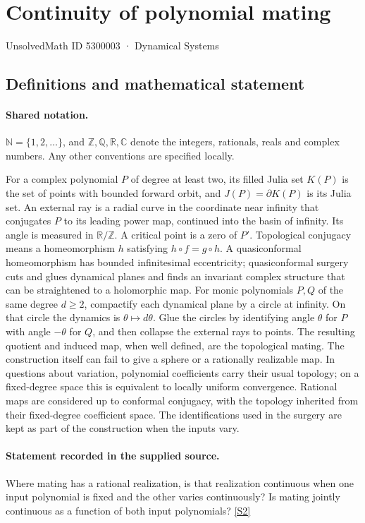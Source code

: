 \documentclass[11pt]{article}
\newcommand{\sref}[2]{\hyperlink{source:#1:#2}{[S#2]}}
\begin{document}
\setcounter{section}{5300002}
\section{Continuity of polynomial mating}\label{5300003}
{\small\sffamily UnsolvedMath ID 5300003 · Dynamical Systems}
\subsection{Definitions and mathematical statement}

\paragraph{Shared notation.}$\mathbb N=\{1,2,\ldots\}$, and $\mathbb Z,\mathbb Q,\mathbb R,\mathbb C$ denote the integers, rationals, reals and complex numbers. Any other conventions are specified locally.


For a complex polynomial $P$ of degree at least two, its filled Julia set $K(P)$ is the set of points with bounded forward orbit, and $J(P)=\partial K(P)$ is its Julia set. An external ray is a radial curve in the coordinate near infinity that conjugates $P$ to its leading power map, continued into the basin of infinity. Its angle is measured in $\mathbb R/\mathbb Z$. A critical point is a zero of $P'$. Topological conjugacy means a homeomorphism $h$ satisfying $h\circ f=g\circ h$. A quasiconformal homeomorphism has bounded infinitesimal eccentricity; quasiconformal surgery cuts and glues dynamical planes and finds an invariant complex structure that can be straightened to a holomorphic map.
For monic polynomials $P,Q$ of the same degree $d\geq2$, compactify each dynamical plane by a circle at infinity. On that circle the dynamics is $\theta\mapsto d\theta$. Glue the circles by identifying angle $\theta$ for $P$ with angle $-\theta$ for $Q$, and then collapse the external rays to points. The resulting quotient and induced map, when well defined, are the topological mating. The construction itself can fail to give a sphere or a rationally realizable map.
In questions about variation, polynomial coefficients carry their usual topology; on a fixed-degree space this is equivalent to locally uniform convergence. Rational maps are considered up to conformal conjugacy, with the topology inherited from their fixed-degree coefficient space. The identifications used in the surgery are kept as part of the construction when the inputs vary.
\paragraph{Statement recorded in the supplied source.}
Where mating has a rational realization, is that realization continuous when one input polynomial is fixed and the other varies continuously? Is mating jointly continuous as a function of both input polynomials? \sref{5300003}{2}
\end{document}
